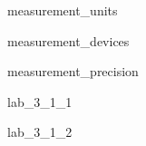 

 {measurement_units}

 {measurement_devices}

 {measurement_precision}

\newpage


 {lab_3_1_1}

 {lab_3_1_2}

